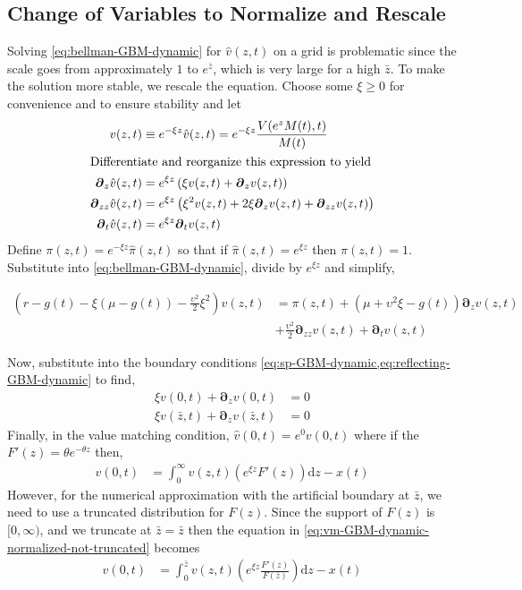 \documentclass[11pt]{article}
\newcommand{\D}[1][]{\ensuremath{\boldsymbol{\partial}_{#1}}}
\newcommand{\diff}{\ensuremath{\mathrm{d}}}
\begin{document}
\subsection{Change of Variables to Normalize and Rescale}\label{eq:simple-rescale}
Solving \cref{eq:bellman-GBM-dynamic} for $\hat{v}(z,t)$ on a grid is problematic since the scale goes from approximately $1$ to $e^{\bar{z}}$, which is very large for a high $\bar{z}$.  To make the solution more stable, we rescale the equation.  Choose some $\xi \geq 0$ for convenience and to ensure stability and let
\begin{align}
	v(z,t) &\equiv e^{-\xi z}\hat{v}(z,t) = e^{-\xi z}\frac{V(e^z M(t),t)}{M(t)}\\
	\intertext{Differentiate and reorganize this expression to yield}
	\D[z]\hat{v}(z,t) &= e^{\xi z}\left(\xi v(z,t) + \D[z]v(z,t) \right)\\
	\D[zz]\hat{v}(z,t) &= e^{\xi z}\left(\xi^{2} v(z,t) + 2 \xi\D[z]v(z,t) + \D[zz]v(z,t)  \right)\\
	\D[t]\hat{v}(z,t) &= e^{\xi z} \D[t]v(z,t)
\end{align}
Define $\pi(z,t) = e^{-\xi z}\hat{\pi}(z,t)$ so that if $\hat{\pi}(z,t) = e^{\xi z}$ then $\pi(z,t) = 1$.  Substitute into \cref{eq:bellman-GBM-dynamic}, divide by $e^{\xi z}$ and simplify,

\begin{align}
	\left(r - g(t)- \xi(\mu-g(t)) - \frac{\upsilon^2}{2}\xi^2\right)  v(z,t) &= \pi(z,t) + (\mu+ \upsilon^2\xi - g(t)) \D[z]v(z,t) \nonumber \\ &+ \frac{\upsilon^2}{2} \D[zz]v(z,t) + \D[t]v(z,t)  \label{eq:bellman-GBM-dynamic-normalized}
\end{align}

\noindent Now, substitute into the boundary conditions \cref{eq:sp-GBM-dynamic,eq:reflecting-GBM-dynamic} to find,
\begin{align}
	\xi v(0,t) + \D[z]v(0,t ) &= 0\label{eq:new-BC1}\\
	\xi v(\bar{z},t) + \D[z]v(\bar{z},t) &= 0\label{eq:new-BC2}
\end{align}
Finally, in the value matching condition, $\hat{v}(0,t) = e^{0} v(0,t)$ where if the $F'(z) = \theta e^{-\theta z}$ then,
\begin{align}
	 v(0,t) &= \int_{0}^{\infty}  v(z,t) \left(e^{\xi z} F'(z)\right) \diff z - x(t)\label{eq:vm-GBM-dynamic-normalized-not-truncated}
\end{align}
However, for the numerical approximation with the artificial boundary at $\bar{z}$, we need to use a truncated distribution for $F(z)$.  Since the support of $F(z)$ is $[0,\infty)$, and we truncate at $\bar{z} = \bar{z}$ then the equation in \cref{eq:vm-GBM-dynamic-normalized-not-truncated} becomes
\begin{align}
	 v(0,t) &= \int_{0}^{\bar{z}}  v(z,t) \left(e^{\xi z} \frac{F'(z)}{F(\bar{z})}\right) \diff z - x(t)\label{eq:vm-GBM-dynamic-normalized}
\end{align}
\end{document}
